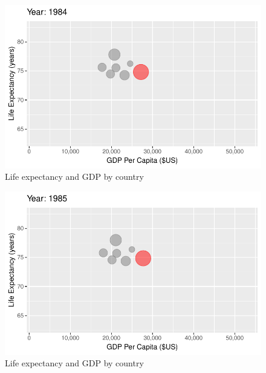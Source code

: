 \documentclass[
  letterpaper,
  DIV=11,
  numbers=noendperiod]{scrreport}
\theoremstyle{definition}
\theoremstyle{remark}
\begin{document}
\begin{figure}

{\centering \includegraphics{index_files/figure-pdf/fig-anim-country-59.pdf}

}

\caption{\label{fig-anim-country-59}Life expectancy and GDP by country}

\end{figure}

\begin{figure}

{\centering \includegraphics{index_files/figure-pdf/fig-anim-country-60.pdf}

}

\caption{\label{fig-anim-country-60}Life expectancy and GDP by country}

\end{figure}
\end{document}
